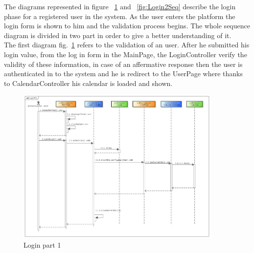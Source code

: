   The diagrams represented in figure ~\ref{fig:Login1Seq}  and ~\ref{fig:Login2Seq} describe the login phase for a registered user in the system. As the user enters the platform the login form is shown to him and the validation process begins. The whole sequence diagram is divided in two part in order to  give a better understanding of it.\\
  The first diagram fig.~\ref{fig:Login1Seq} refers to the validation of an user. After he submitted his login value, from the log in form in the MainPage, the LoginController verify the validity of these information, in case of an affermative response then the user is authenticated in to the system and he is redirect to the UserPage where thanks to CalendarController his calendar is loaded and shown.
  \begin{center}
 \begin{figure}[H]
    \includegraphics[width=0.9\textwidth]{./BCEDiagram/BCE/EntityOverview/LogInPt1.png}
    \caption{Login part 1}
     \label{fig:Login1Seq}
     \end{figure}
   \end{center}  
